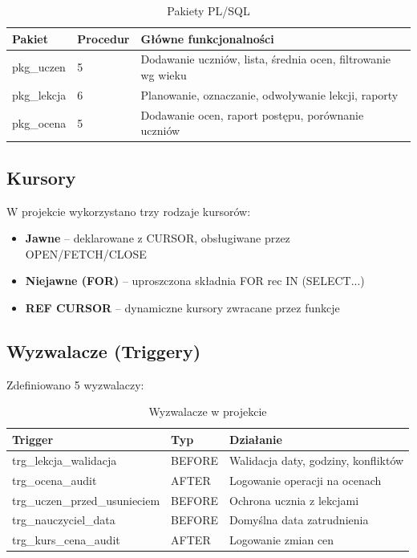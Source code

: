 \documentclass[12pt,a4paper]{article}
\begin{document}
\begin{table}[h]
\centering
\begin{tabular}{|l|l|p{7cm}|}
\hline
\textbf{Pakiet} & \textbf{Procedur} & \textbf{Główne funkcjonalności} \\
\hline
pkg\_uczen & 5 & Dodawanie uczniów, lista, średnia ocen, filtrowanie wg wieku \\
pkg\_lekcja & 6 & Planowanie, oznaczanie, odwoływanie lekcji, raporty \\
pkg\_ocena & 5 & Dodawanie ocen, raport postępu, porównanie uczniów \\
\hline
\end{tabular}
\caption{Pakiety PL/SQL}
\end{table}

\subsection{Kursory}
W projekcie wykorzystano trzy rodzaje kursorów:
\begin{itemize}[nosep]
    \item \textbf{Jawne} -- deklarowane z CURSOR, obsługiwane przez OPEN/FETCH/CLOSE
    \item \textbf{Niejawne (FOR)} -- uproszczona składnia FOR rec IN (SELECT...)
    \item \textbf{REF CURSOR} -- dynamiczne kursory zwracane przez funkcje
\end{itemize}

\subsection{Wyzwalacze (Triggery)}
Zdefiniowano 5 wyzwalaczy:

\begin{table}[h]
\centering
\begin{tabular}{|l|l|p{6cm}|}
\hline
\textbf{Trigger} & \textbf{Typ} & \textbf{Działanie} \\
\hline
trg\_lekcja\_walidacja & BEFORE & Walidacja daty, godziny, konfliktów \\
trg\_ocena\_audit & AFTER & Logowanie operacji na ocenach \\
trg\_uczen\_przed\_usunieciem & BEFORE & Ochrona ucznia z lekcjami \\
trg\_nauczyciel\_data & BEFORE & Domyślna data zatrudnienia \\
trg\_kurs\_cena\_audit & AFTER & Logowanie zmian cen \\
\hline
\end{tabular}
\caption{Wyzwalacze w projekcie}
\end{table}
\end{document}
